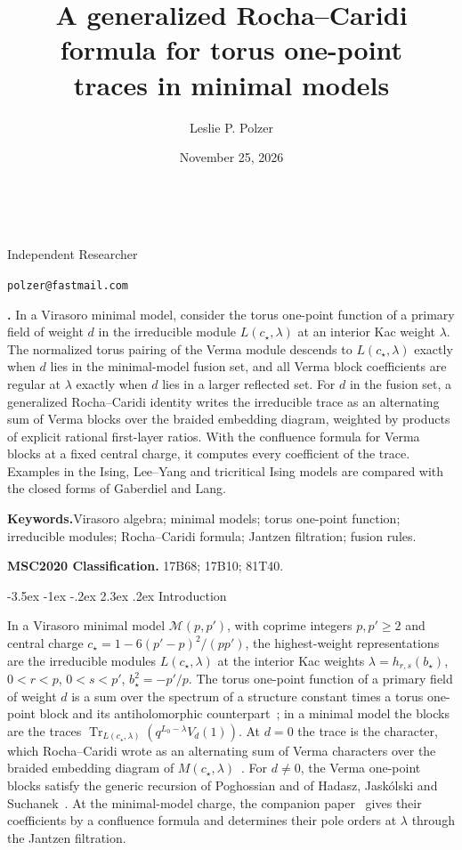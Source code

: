 \documentclass[twoside,10pt]{article}
\title{A generalized Rocha--Caridi formula for torus one-point\\
traces in minimal models}
\author{Leslie P. Polzer}
\date{November 25, 2026}
\makeatletter
\numberwithin{equation}{section}
\theoremstyle{slbody}
\theoremstyle{definition}
\theoremstyle{remark}
\newcommand{\Tr}{\operatorname{Tr}}
\newcommand{\authoraffiliation}{Independent Researcher}
\newcommand{\authoremail}{polzer@fastmail.com}
\renewcommand{\section}{%
  \@startsection{section}{1}{\z@}%
    {-3.5ex \@plus -1ex \@minus -.2ex}%
    {2.3ex \@plus .2ex}%
    {\normalfont\large\bfseries}}
\renewcommand{\maketitle}{%
  \begin{center}
    {\large\bfseries\@title}\\
    \vskip36pt
    \ifx\@author\@empty
      \mbox{}\par
    \else
      {\scshape\@author}\par
      \medskip
      {\small\authoraffiliation}\par
      \smallskip
      {\small\texttt{\authoremail}}\par
      \smallskip
      {\small\@date}\par
    \fi
    \vskip36pt
  \end{center}}
\renewenvironment{abstract}
  {\quotation\noindent\small{\bfseries\abstractname.\enspace}}
  {\endquotation}
\makeatother
\begin{document}
\maketitle

\begin{abstract}
In a Virasoro minimal model, consider the torus one-point function of a
primary field of weight \(d\) in the irreducible module \(L(c_\star,\lambda)\)
at an interior Kac weight \(\lambda\).  The normalized torus pairing of the
Verma module descends to \(L(c_\star,\lambda)\) exactly when \(d\) lies in the
minimal-model fusion set, and all Verma block coefficients are regular at
\(\lambda\) exactly when \(d\) lies in a larger reflected set.  For \(d\) in
the fusion set, a generalized Rocha--Caridi identity writes the irreducible
trace as an alternating sum of Verma blocks over the braided embedding
diagram, weighted by products of explicit rational first-layer ratios.  With
the confluence formula for Verma blocks at a fixed central charge, it
computes every coefficient of the trace.  Examples in the Ising, Lee--Yang
and tricritical Ising models are compared with the closed forms of Gaberdiel
and Lang.

\vskip5pt
\noindent\textbf{Keywords.}\enspace Virasoro algebra; minimal models; torus
one-point function; irreducible modules; Rocha--Caridi formula; Jantzen
filtration; fusion rules.

\vskip5pt
\noindent\textbf{MSC2020 Classification.}\enspace
17B68; 17B10; 81T40.
\end{abstract}

\vskip24pt
\baselineskip=13.5pt

\section{Introduction}\label{sec:intro}

In a Virasoro minimal model \(\mathcal M(p,p')\), with coprime integers
\(p,p'\geq2\) and central charge \(c_\star=1-6(p'-p)^2/(pp')\), the
highest-weight representations are the irreducible modules
\(L(c_\star,\lambda)\) at the interior Kac weights
\(\lambda=h_{r,s}(b_\star)\), \(0<r<p\), \(0<s<p'\), \(b_\star^2=-p'/p\).
The torus one-point function of a primary field of weight \(d\) is a sum
over the spectrum of a structure constant times a torus one-point block and
its antiholomorphic counterpart~\cite[\S2]{HadaszJaskolskiSuchanek2010}; in a
minimal model the blocks are the traces
\(\Tr_{L(c_\star,\lambda)}(q^{L_0-\lambda}V_d(1))\).
At \(d=0\) the trace is the character, which Rocha--Caridi wrote as an
alternating sum of Verma characters over the braided embedding diagram of
\(M(c_\star,\lambda)\)~\cite{RochaCaridi1985}.  For \(d\neq0\), the Verma
one-point blocks satisfy the generic recursion of Poghossian and of Hadasz,
Jask\'olski and Suchanek~\cite{Poghossian2009,HadaszJaskolskiSuchanek2010}.
At the minimal-model charge, the companion paper~\cite{PolzerColliding2026}
gives their coefficients by a confluence formula and determines their pole
orders at \(\lambda\) through the Jantzen filtration.
\end{document}
